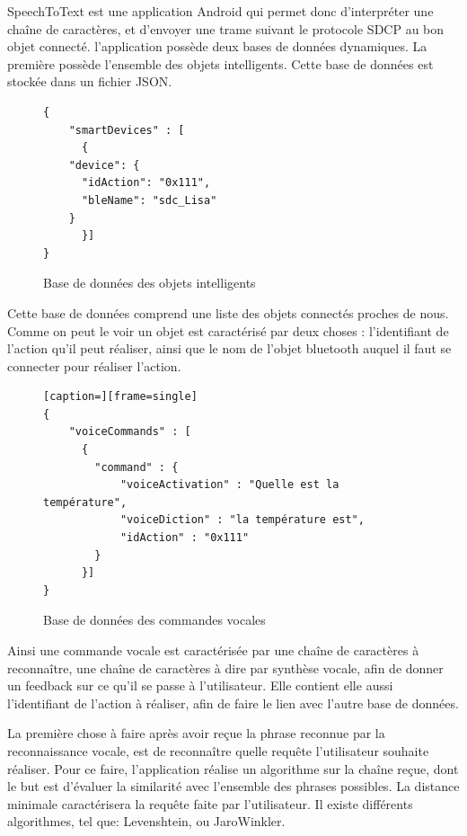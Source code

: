 SpeechToText est une application Android qui permet donc d'interpréter une chaîne de caractères, et 
d'envoyer une trame suivant le protocole SDCP au bon objet connecté. l'application possède deux bases de 
données dynamiques. La première possède l'ensemble des objets intelligents. Cette base de données est stockée 
dans un 
fichier JSON.

\begin{figure}[!ht]
         \centering
         	\begin{lstlisting}
{
    "smartDevices" : [
      {
	"device": {
	  "idAction": "0x111",
	  "bleName": "sdc_Lisa"
	}
      }]
}
		\end{lstlisting}
         \caption{Base de données des objets intelligents}
         \label{BDD_smart}
\end{figure}


Cette base de données comprend une liste des objets connectés proches de nous. Comme on peut le voir un objet 
est caractérisé par deux choses : l'identifiant de l'action qu'il peut réaliser, ainsi que le nom de l'objet 
bluetooth auquel il faut se connecter pour réaliser l'action.

\begin{figure}[!ht]
         \centering
	 \begin{lstlisting}[caption=][frame=single]
{
    "voiceCommands" : [
      {
        "command" : {
            "voiceActivation" : "Quelle est la température",
            "voiceDiction" : "la température est",
            "idAction" : "0x111"
        }
      }]
}
	 \end{lstlisting}
         \caption{Base de données des commandes vocales}
         \label{BDD_objects}
\end{figure}



Ainsi une commande vocale est caractérisée par une chaîne de caractères à reconnaître, une chaîne de 
caractères à dire par synthèse vocale, afin de donner un feedback sur ce qu'il se passe à l'utilisateur. Elle 
contient elle aussi l'identifiant de l'action à réaliser, afin de faire le lien avec l'autre base de données.

La première chose à faire après avoir reçue la phrase reconnue par la reconnaissance vocale, est de 
reconnaître quelle requête l'utilisateur souhaite réaliser. Pour ce faire, l'application réalise un algorithme 
sur la chaîne reçue, dont le but est d'évaluer la similarité avec l'ensemble des 
phrases possibles. La distance minimale caractérisera la requête faite par l'utilisateur. Il existe 
différents algorithmes, tel que: Levenshtein, ou JaroWinkler.

